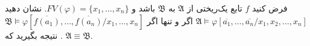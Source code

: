 فرض کنید
$f$
تابع یک‌ریختی از 
$\mathfrak{A}$
به 
$\mathfrak{B}$
باشد و 
$FV(\varphi) = \{x_{1},\dots, x_{n}\}$.
نشان دهید
$\mathfrak{A}\models\varphi[\overline{a_1}, \dots, \overline{a_n} / x_{1},x_{2},\dots, x_{n}]$
اگر و تنها اگر 
$\mathfrak{B}\models\varphi[\overline{f(a_1)}, \dots, \overline{f(a_n)} / x_1, \dots, x_n]$.
نتیجه بگیرید که 
$\mathfrak{A}\equiv\mathfrak{B}$.